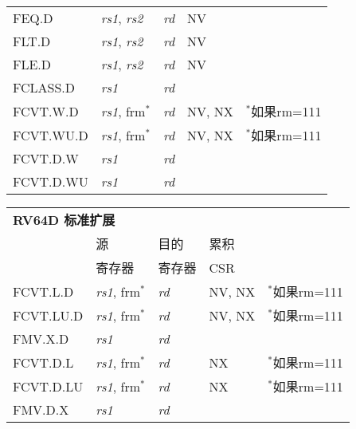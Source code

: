 \begin{tabular}{p{3cm}|p{3cm}|p{2cm}|p{4cm}|p{4cm}}
   \cline{2-4}
   FEQ.D & {\em rs1}, {\em rs2} & {\em rd} & NV &   \\
   \cline{2-4}
   FLT.D & {\em rs1}, {\em rs2} & {\em rd} & NV &   \\
   \cline{2-4}
   FLE.D & {\em rs1}, {\em rs2} & {\em rd} & NV &   \\
   \cline{2-4}
   FCLASS.D & {\em rs1} & {\em rd} &   & \\
   \cline{2-4}
   FCVT.W.D & {\em rs1}, frm$^*$ & {\em rd} & NV, NX & $^*$如果rm=111  \\
   \cline{2-4}
   FCVT.WU.D & {\em rs1}, frm$^*$ & {\em rd} & NV, NX & $^*$如果rm=111  \\
   \cline{2-4}
   FCVT.D.W & {\em rs1} & {\em rd} &  & \\
   \cline{2-4}
   FCVT.D.WU & {\em rs1} & {\em rd} &  & \\
   \cline{2-4}
\end{tabular}

\begin{tabular}{p{3cm}|p{3cm}|p{2cm}|p{4cm}|p{4cm}}
  \multicolumn{4}{l}{\bf RV64D 标准扩展} \\
  \cline{2-4}
    & 源    & 目的 & 累积 \\
    & 寄存器 & 寄存器   & CSR \\
  \cline{2-4}
   FCVT.L.D & {\em rs1}, frm$^*$ & {\em rd} & NV, NX & $^*$如果rm=111  \\
   \cline{2-4}
   FCVT.LU.D & {\em rs1}, frm$^*$ & {\em rd} & NV, NX & $^*$如果rm=111  \\
   \cline{2-4}
   FMV.X.D & {\em rs1} & {\em rd} &   & \\
   \cline{2-4}
   FCVT.D.L & {\em rs1}, frm$^*$ & {\em rd} & NX & $^*$如果rm=111  \\
   \cline{2-4}
   FCVT.D.LU & {\em rs1}, frm$^*$ & {\em rd} & NX & $^*$如果rm=111  \\
   \cline{2-4}
   FMV.D.X & {\em rs1} & {\em rd} &   & \\
   \cline{2-4}
\end{tabular}

